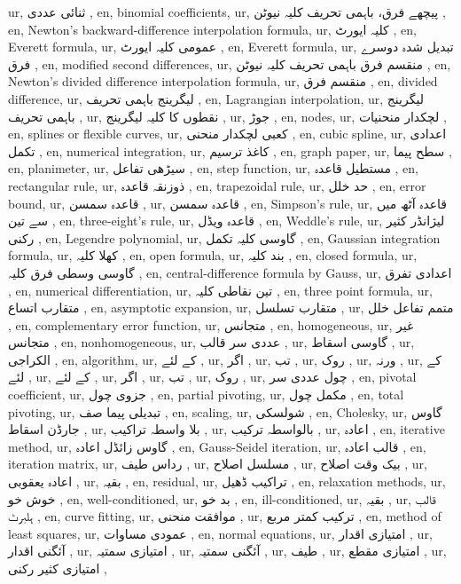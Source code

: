 ur, ثنائی عددی ,
en, binomial coefficients,
ur, پیچھے فرق، باہمی تحریف کلیہ نیوٹن ,
en, Newton's backward-difference interpolation formula,
ur, کلیہ ایورٹ ,
en, Everett formula,
ur, عمومی کلیہ ایورٹ ,
en, Everett formula,
ur, تبدیل شدہ دوسرے فرق ,
en, modified second differences,
ur, منقسم فرق باہمی تحریف کلیہ نیوٹن ,
en, Newton's divided difference interpolation formula,
ur, منقسم فرق ,
en, divided difference,
ur, لیگرینج باہمی تحریف ,
en, Lagrangian interpolation,
ur, لیگرینج باہمی تحریف ,
ur,  نقطوں کا کلیہ لیگرینج ,
ur, جوڑ ,
en, nodes,
ur, لچکدار منحنیات ,
en, splines or flexible curves,
ur, کعبی لچکدار منحنی ,
en, cubic spline,
ur, اعدادی تکمل ,
en, numerical integration,
ur, کاغذ ترسیم ,
en, graph paper,
ur, سطح پیما ,
en, planimeter,
ur, سیڑھی تفاعل ,
en, step function,
ur, مستطیل قاعدہ ,
en, rectangular rule,
ur, ذوزنقہ قاعدہ ,
en, trapezoidal rule,
ur, حد خلل ,
en, error bound,
ur, قاعدہ سمسن ,
ur, قاعدہ سمسن ,
en, Simpson's rule,
ur, قاعدہ آٹھ میں سے تین ,
en, three-eight's rule,
ur, قاعدہ ویڈل ,
en, Weddle's rule,
ur, لیژانڈر کثیر رکنی ,
en, Legendre polynomial,
ur, گاوسی کلیہ تکمل ,
en, Gaussian integration formula,
ur, کھلا کلیہ ,
en, open formula,
ur, بند کلیہ ,
en, closed formula,
ur, گاوسی وسطی فرق کلیہ ,
en, central-difference formula by Gauss,
ur, اعدادی تفرق ,
en, numerical differentiation,
ur, تین نقاطی کلیہ ,
en, three point formula,
ur, متقارب اتساع ,
en, asymptotic expansion,
ur, متقارب تسلسل ,
ur, متمم تفاعل خلل ,
en, complementary error function,
ur, متجانس ,
en, homogeneous,
ur, غیر متجانس ,
en, nonhomogeneous,
ur, عددی سر قالب ,
ur, گاوسی اسقاط ,
ur, الکراجی ,
en, algorithm,
ur, کے لئے ,
ur, اگر ,
ur, تب ,
ur, روک ,
ur, ورنہ ,
ur, کے لئے ,
ur, کے لئے ,
ur, اگر ,
ur, تب ,
ur, روک ,
ur, چول عددی سر ,
en, pivotal coefficient,
ur, جزوی چول ,
en, partial pivoting,
ur, مکمل چول ,
en, total pivoting,
ur, تبدیلی پیما صف ,
en, scaling,
ur, شولسکی ,
en, Cholesky,
ur, گاوس جارڈن اسقاط ,
ur, بلا واسطہ تراکیب ,
ur, بالواسطہ ترکیب ,
ur, اعادہ ,
en, iterative method,
ur, گاوس زائڈل اعادہ ,
en, Gauss-Seidel iteration,
ur, قالب اعادہ ,
en, iteration matrix,
ur, رداس طیف ,
ur, مسلسل اصلاح ,
ur, بیک وقت اصلاح ,
ur, اعادہ یعقوبی ,
ur, بقیہ ,
en, residual,
ur, تراکیب ڈھیل ,
en, relaxation methods,
ur, خوش خو ,
en, well-conditioned,
ur, بد خو ,
en, ill-conditioned,
ur, بقیہ ,
ur, قالب ہلبرٹ ,
en, curve fitting,
ur, موافقت منحنی ,
ur, ترکیب کمتر مربع ,
en, method of least squares,
ur, عمودی مساوات ,
en, normal equations,
ur, امتیازی اقدار ,
ur, آئگنی اقدار ,
ur, امتیازی سمتیہ ,
ur, آئگنی سمتیہ ,
ur, طیف ,
ur, امتیازی مقطع ,
ur, امتیازی کثیر رکنی ,
